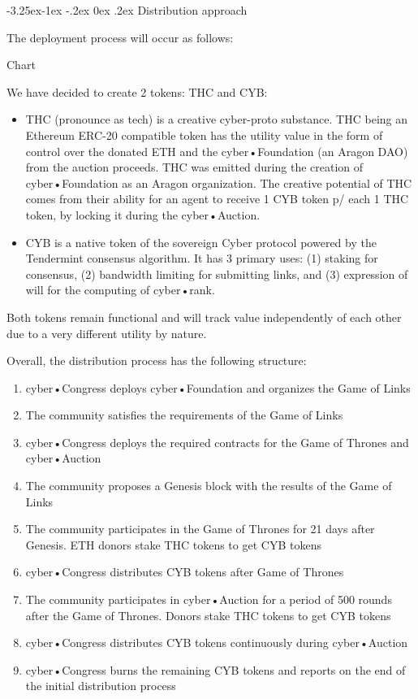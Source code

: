 \documentclass[8pt,oneside]{amsart}
\makeatletter
\renewcommand\subsection{\@startsection{subsection}{2}{\z@}%
                                     {-3.25ex\@plus -1ex \@minus -.2ex}%
                                     {0ex \@plus .2ex}%
                                     {\play\Large}}%
\newcommand{\titleSection}[1]{\subsection{#1}}
\makeatother
\begin{document}
\begin{Abstract}
\titleSection{Distribution approach}\label{Distribution approach}

The deployment process will occur as follows:

Chart

We have decided to create 2 tokens: THC and CYB:

\begin{itemize}
\item THC (pronounce as tech) is a creative cyber-proto substance. THC being an Ethereum ERC-20 compatible token has the utility value in the form of control over the donated ETH and the cyber•Foundation (an Aragon DAO) from the auction proceeds. THC was emitted during the creation of cyber•Foundation as an Aragon organization. The creative potential of THC comes from their ability for an agent to receive 1 CYB token p/ each 1 THC token, by locking it during the cyber•Auction.
\item CYB is a native token of the sovereign Cyber protocol powered by the Tendermint consensus algorithm. It has 3 primary uses: (1) staking for consensus, (2) bandwidth limiting for submitting links, and (3) expression of will for the computing of cyber•rank.
\end{itemize}

Both tokens remain functional and will track value independently of each other due to a very different utility by nature.

Overall, the distribution process has the following structure:

\begin{enumerate}
 \item cyber•Congress deploys cyber•Foundation and organizes the Game of Links
 \item The community satisfies the requirements of the Game of Links
 \item cyber•Congress deploys the required contracts for the Game of Thrones and cyber•Auction
 \item The community proposes a Genesis block with the results of the Game of Links
 \item The community participates in the Game of Thrones for 21 days after Genesis. ETH donors stake THC tokens to get CYB tokens
 \item cyber•Congress distributes CYB tokens after Game of Thrones
 \item The community participates in cyber•Auction for a period of 500 rounds after the Game of Thrones. Donors stake THC tokens to get CYB tokens
 \item cyber•Congress distributes CYB tokens continuously during cyber•Auction
 \item cyber•Congress burns the remaining CYB tokens and reports on the end of the initial distribution process
\end{enumerate}


\end{Abstract}
\end{document}
